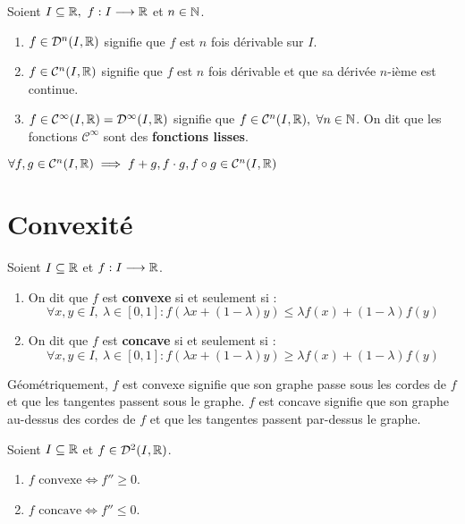 \begin{definition}
	Soient $I \subseteq \mathbb{R},\ f : I \longrightarrow \mathbb{R}$ et $n \in \mathbb{N}$.
	\begin{enumerate}
		\item $f \in \mathcal{D}^n(I, \mathbb{R})$ signifie que $f$ est $n$ fois dérivable sur $I$.
		\item $f \in \mathcal{C}^n(I, \mathbb{R})$ signifie que $f$ est $n$ fois dérivable et que sa dérivée $n$-ième est continue.
		\item $f \in \mathcal{C}^{\infty}(I, \mathbb{R}) = \mathcal{D}^{\infty}(I, \mathbb{R})$ signifie que $f \in \mathcal{C}^n(I, \mathbb{R}),\ \forall n \in \mathbb{N}$. On dit que les fonctions $\mathcal{C}^{\infty}$ sont des \textbf{fonctions lisses}.
	\end{enumerate}
\end{definition}

\begin{proposition}
	$\forall f, g \in \mathcal{C}^n(I, \mathbb{R}) \implies f + g, f \cdot g, f \circ g \in \mathcal{C}^n(I, \mathbb{R})$
\end{proposition}

\section{Convexité}
\begin{definition}
    Soient $I \subseteq \mathbb{R}$ et $f : I \longrightarrow \mathbb{R}$.
    \begin{enumerate}
        \item On dit que $f$ est \textbf{convexe} si et seulement si : 
        \[ \forall x, y \in I,\ \lambda \in [0, 1] : f(\lambda x + (1 - \lambda)y) \leq \lambda f(x) + (1 - \lambda) f(y) \]
        \item On dit que $f$ est \textbf{concave} si et seulement si : 
        \[ \forall x, y \in I,\ \lambda \in [0, 1] : f(\lambda x + (1 - \lambda)y) \geq \lambda f(x) + (1 - \lambda) f(y) \]
    \end{enumerate}
\end{definition}

\par Géométriquement, $f$ est convexe signifie que son graphe passe sous les cordes de $f$ et que les tangentes passent sous le graphe. $f$ est concave signifie que son graphe au-dessus des cordes de $f$ et que les tangentes passent par-dessus le graphe.

\begin{theorem}
	Soient $I \subseteq \mathbb{R}$ et $f \in \mathcal{D}^2(I, \mathbb{R})$.
        \begin{enumerate}
                \item $f \text{ convexe} \iff f'' \geq 0$.
                \item $f \text{ concave} \iff f'' \leq 0$.
            \end{enumerate}
\end{theorem}

